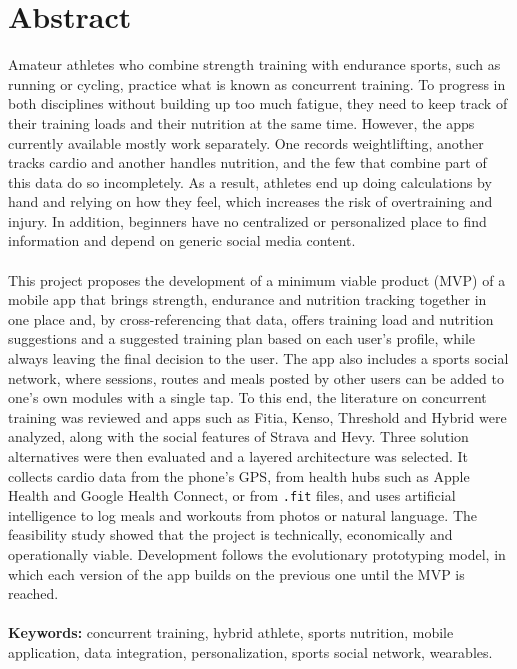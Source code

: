\section*{Abstract}
Amateur athletes who combine strength training with endurance sports, such as running or cycling, practice what is known as concurrent training. To progress in both disciplines without building up too much fatigue, they need to keep track of their training loads and their nutrition at the same time. However, the apps currently available mostly work separately. One records weightlifting, another tracks cardio and another handles nutrition, and the few that combine part of this data do so incompletely. As a result, athletes end up doing calculations by hand and relying on how they feel, which increases the risk of overtraining and injury. In addition, beginners have no centralized or personalized place to find information and depend on generic social media content.
\\\\
This project proposes the development of a minimum viable product (MVP) of a mobile app that brings strength, endurance and nutrition tracking together in one place and, by cross-referencing that data, offers training load and nutrition suggestions and a suggested training plan based on each user's profile, while always leaving the final decision to the user. The app also includes a sports social network, where sessions, routes and meals posted by other users can be added to one's own modules with a single tap. To this end, the literature on concurrent training was reviewed and apps such as Fitia, Kenso, Threshold and Hybrid were analyzed, along with the social features of Strava and Hevy. Three solution alternatives were then evaluated and a layered architecture was selected. It collects cardio data from the phone's GPS, from health hubs such as Apple Health and Google Health Connect, or from \texttt{.fit} files, and uses artificial intelligence to log meals and workouts from photos or natural language. The feasibility study showed that the project is technically, economically and operationally viable. Development follows the evolutionary prototyping model, in which each version of the app builds on the previous one until the MVP is reached.
\\\\
\textbf{Keywords:} concurrent training, hybrid athlete, sports nutrition, mobile application, data integration, personalization, sports social network, wearables.
\newpage
{}
